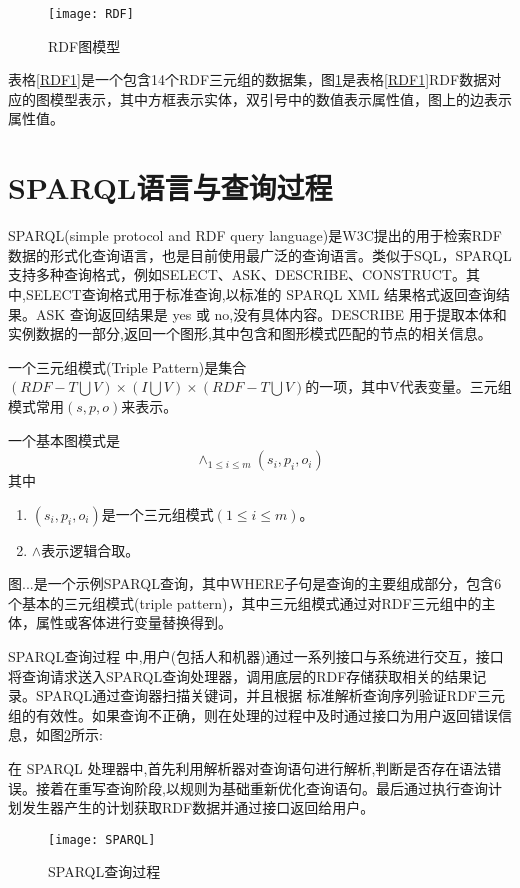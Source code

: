 \begin{figure}[h]
    \centering
    \texttt{[image: RDF]}
    \caption{RDF图模型}
    \label{RDFPhoto}
\end{figure}

表格\ref{RDF1}是一个包含14个RDF三元组的数据集，图\ref{RDFPhoto}是表格\ref{RDF1}RDF数据对应的图模型表示，其中方框表示实体，双引号中的数值表示属性值，图上的边表示属性值。


\section{SPARQL语言与查询过程}

SPARQL(simple protocol and RDF query language)是W3C提出的用于检索RDF数据的形式化查询语言，也是目前使用最广泛的查询语言。类似于SQL，SPARQL支持多种查询格式，例如SELECT、ASK、DESCRIBE、CONSTRUCT。其中,SELECT查询格式用于标准查询,以标准的 SPARQL XML 结果格式返回查询结果。ASK 查询返回结果是 yes 或 no,没有具体内容。DESCRIBE 用于提取本体和实例数据的一部分,返回一个图形,其中包含和图形模式匹配的节点的相关信息。
\begin{definition}[（三元组模式）] 
    \label{Triple}   
    一个三元组模式(Triple Pattern)是集合$(RDF-T \bigcup V)\times(I \bigcup V)\times(RDF-T \bigcup V)$的一项，其中V代表变量。三元组模式常用$(s,p,o)$来表示。
\end{definition}
\begin{definition}    
    \label{BGP}
    一个基本图模式是$$\wedge_{1\leqslant i\leqslant m}(s_i,p_i,o_i)$$
    其中
    \begin{enumerate}
        \item $(s_i,p_i,o_i)$是一个三元组模式$(1 \leqslant  i \leqslant m)$。
        \item $\wedge$表示逻辑合取。
    \end{enumerate}
    
\end{definition}
图...是一个示例SPARQL查询，其中WHERE子句是查询的主要组成部分，包含6个基本的三元组模式(triple pattern)，其中三元组模式通过对RDF三元组中的主体，属性或客体进行变量替换得到。

SPARQL查询过程 中,用户(包括人和机器)通过一系列接口与系统进行交互，接口将查询请求送入SPARQL查询处理器，调用底层的RDF存储获取相关的结果记录。SPARQL通过查询器扫描关键词，并且根据
标准解析查询序列验证RDF三元组的有效性。如果查询不正确，则在处理的过程中及时通过接口为用户返回错误信息，如图\ref{SPARQL查询过程}所示:

在 SPARQL 处理器中,首先利用解析器对查询语句进行解析,判断是否存在语法错误。接着在重写查询阶段,以规则为基础重新优化查询语句。最后通过执行查询计划发生器产生的计划获取RDF数据并通过接口返回给用户。
\begin{figure}[h]
\centering
\texttt{[image: SPARQL]}
\caption{SPARQL查询过程}
\label{SPARQL查询过程}
\end{figure}

